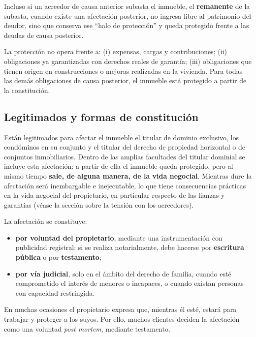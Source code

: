 \documentclass[12pt,oneside]{book}
\begin{document}
\begin{importante}
Incluso si un acreedor de causa anterior subasta el inmueble, el \textbf{remanente} de la subasta, cuando existe una afectación posterior, no ingresa libre al patrimonio del deudor, sino que conserva ese ``halo de protección'' y queda protegido frente a las deudas de causa posterior.
\end{importante}

La protección no opera frente a: (i) expensas, cargas y contribuciones; (ii) obligaciones ya garantizadas con derechos reales de garantía; (iii) obligaciones que tienen origen en construcciones o mejoras realizadas en la vivienda. Para todas las demás obligaciones de causa posterior, el inmueble está protegido a partir de la constitución.

\subsection{Legitimados y formas de constitución}

Están legitimados para afectar el inmueble el titular de dominio exclusivo, los condóminos en su conjunto y el titular del derecho de propiedad horizontal o de conjuntos inmobiliarios. Dentro de las amplias facultades del titular dominial se incluye esta afectación: a partir de ella el inmueble queda protegido, pero al mismo tiempo \textbf{sale, de alguna manera, de la vida negocial}. Mientras dure la afectación será inembargable e inejecutable, lo que tiene consecuencias prácticas en la vida negocial del propietario, en particular respecto de las fianzas y garantías (véase la sección sobre la tensión con los acreedores).

La afectación se constituye:
\begin{itemize}
    \item \textbf{por voluntad del propietario}, mediante una instrumentación con publicidad registral; si se realiza notarialmente, debe hacerse por \textbf{escritura pública} o por \textbf{testamento};
    \item \textbf{por vía judicial}, solo en el ámbito del derecho de familia, cuando esté comprometido el interés de menores o incapaces, o cuando existan personas con capacidad restringida.
\end{itemize}

\begin{nota}
En muchas ocasiones el propietario expresa que, mientras él esté, estará para trabajar y proteger a los suyos. Por ello, muchos clientes deciden la afectación como una voluntad \textit{post mortem}, mediante testamento.
\end{nota}
\end{document}
